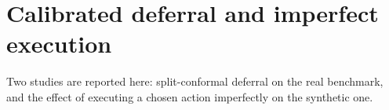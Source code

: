 \section{Calibrated deferral and imperfect execution}
\label{sec:supp-noise}

Two studies are reported here: split-conformal deferral on the real benchmark, and the effect of executing a chosen action imperfectly on the synthetic one.

\begin{table}[!ht]
\caption{\textbf{Executing the chosen action imperfectly, paired over $11$ seeds}
($\pm 1$~cm, $\pm 0.5^{\circ}$). Methods that take no action are unchanged at
exactly $0.0\%$, the check that perturbation cannot reach a method that does not
act. Among methods that do act, the hypothesis-blind proxy loses roughly half its
accuracy while ours loses $2.9\%$: actions chosen with a large separability margin
tolerate perturbation, and that margin is what \eqref{eq:maximin} maximises.}
\label{tab:noise}
\begin{center}
\footnotesize
{}
\end{center}
\end{table}

